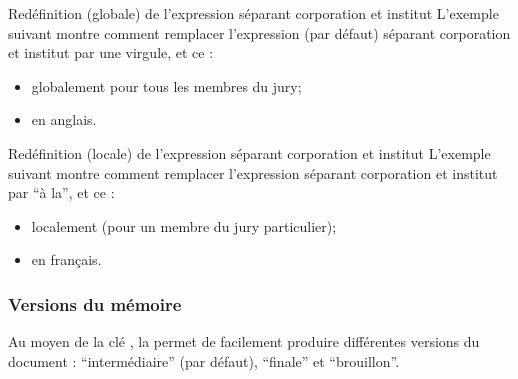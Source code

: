 \begin{dbexample}{Redéfinition (globale) de l'expression séparant corporation et
    institut}{}
  L'exemple suivant montre comment remplacer l'expression (par défaut) séparant
  corporation et institut par une virgule, et ce :
  \begin{itemize}
  \item globalement pour tous les membres du jury;
  \item en anglais.
  \end{itemize}
\end{dbexample}

\begin{dbexample}{Redéfinition (locale) de l'expression séparant corporation et
    institut}{}
  L'exemple suivant montre comment remplacer l'expression séparant corporation
  et institut par \enquote{\textvisiblespace{}à la\textvisiblespace{}}, et ce :
  \begin{itemize}
  \item localement (pour un membre du jury particulier);
  \item en français.
  \end{itemize}
\begin{bodycode}
\end{bodycode}
\end{dbexample}

\subsubsection{Versions du mémoire}\label{sec:versions}

Au moyen de la clé , la \yatcl{} permet de facilement produire
différentes versions du document : \enquote{intermédiaire} (par défaut),
\enquote{finale} et \enquote{brouillon}.

